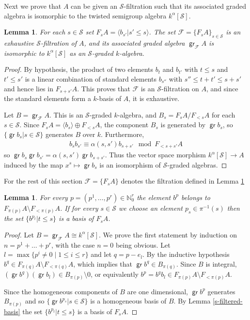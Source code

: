 \documentclass[11pt,fleqn]{article}
\theoremstyle{plain}
\newtheorem{Lemma}[Theorem]{Lemma}
\theoremstyle{remark}
\theoremstyle{definition}
\newcommand\NN{\mathbb N}
\renewcommand\to{\longrightarrow}
\renewcommand\S{\mathcal S}
\newcommand\F{\mathcal F}
\DeclareMathOperator\gr{\mathsf{gr}}
\begin{document}
Next we prove that $A$ can be given an $\S$-filtration such that its associated graded
algebra is isomorphic to the twisted semigroup algebra $k^\alpha[\S]$.
\begin{Lemma}
\label{varia-dominated} 
For each $s \in \S$ set $F_sA = \langle b_{s'}|s'\leq s \rangle$.
The set $\F= \{F_sA\}_{s \in \S}$ is an exhaustive $\S$-filtration of $A$, and its
associated graded algebra $\gr_\F A$ is isomorphic to $k^\alpha[\S]$ as an $\S$-graded
$k$-algebra.
\end{Lemma}
\begin{proof}
By hypothesis, the product of two elements $b_{t}$ and $b_{t'}$ with $t \leq s$ and $t' \leq
s'$ is a linear combination of standard elements $b_{s''}$ with $s'' \leq t + t' \leq s +
s'$ and hence lies in $F_{s+s'}A$. This proves that $\F$ is an $\S$-filtration on $A$, and
since the standard elements form a $k$-basis of $A$, it is exhaustive.

Let $B = \gr_\F A$. This is an $\S$-graded $k$-algebra, and $B_s = F_sA /F_{ < s}A$ for
each $s \in \S$. Since $F_sA = \langle b_s \rangle \oplus F_{<s}A$, the component $B_s$ is 
generated by $\gr b_s$, so $\{\gr b_s| s \in \S\}$ generates $B$ over $k$. Furthermore,
\begin{align*}
b_s b_{s'} \equiv \alpha(s,s') b_{s+s'} \mod F_{<s+s'}A
\end{align*}
so $\gr b_s \gr b_{s'} = \alpha(s,s') \gr b_{s+s'}$. Thus the vector space morphism
$k^\alpha[\S] \to A$ induced by the map $x^s \mapsto \gr b_s$ is an isomorphism of
$\S$-graded algebras.
\end{proof}

For the rest of this section $\F = \{F_sA\}$ denotes the filtration defined in Lemma
\ref{varia-dominated} 
\begin{Lemma}
\label{monomial-basis}
  For every $p = (p^1, \ldots, p^r) \in \NN_0^r$ the element $b^p$ belongs to $F_{\pi(p)}A
  \setminus F_{<\pi(p)}A$. If for every $s \in \S$ we choose an element $p_s \in
  \pi^{-1}(s)$ then the set $\{b^{p_t}|t \leq s\}$ is a basis of $F_{s}A$.
\end{Lemma}
\begin{proof}
  Let $B = \gr_\F A \cong k^\alpha[\S]$. We prove the first statement by induction on $n =
  p^1 + \ldots + p^r$, with the case $n = 0$ being obvious. Let $l = \max \{p^i \neq 0
  \mid 1 \leq i \leq r \}$ and let $q = p - e_l$. By
  the inductive hypothesis $b^q \in F_{\pi(q)}A \setminus F_{< \pi(q)}A$, which implies
  that $\gr b^q \in B_{\pi(q)}$. Since $B$ is integral, $(\gr b^q) (\gr b_l)
  \in B_{\pi(p)} \setminus 0$, or equivalently $b^p = b^q b_l \in F_{\pi(p)}A \setminus
  F_{<\pi(p)}A$. 
  
  Since the homogeneous components of $B$ are one dimensional, $\gr b^p$ generates
  $B_{\pi(p)}$ and so $\{\gr b^{p_s}|s \in \S\}$ is a homogeneous basis of $B$. By Lemma
  \ref{s-filtered-basis} the set $\{b^{p_t}|t \leq s\}$ is a basis of $F_sA$.
\end{proof}
\end{document}
